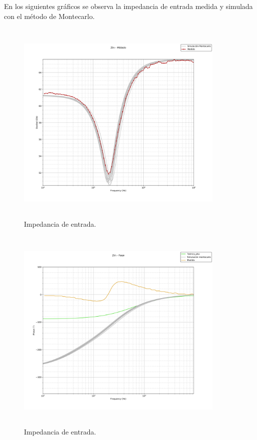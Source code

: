 En los siguientes gr\'aficos se observa la impedancia de entrada medida y simulada con el m\'etodo de Montecarlo.
\begin{figure}[H] %
	\centering
	\includegraphics[width=10cm,height=10cm,keepaspectratio]{../EJ1/00GRAFICOS/zin_modulo_sinTeorico.png}
	\caption{Impedancia de entrada.}
	\label{zin_mod}
\end{figure}

\begin{figure}[H] %
	\centering
	\includegraphics[width=10cm,height=10cm,keepaspectratio]{../EJ1/00GRAFICOS/zinn.png}
	\caption{Impedancia de entrada.}
	\label{zin_fase}
\end{figure}

